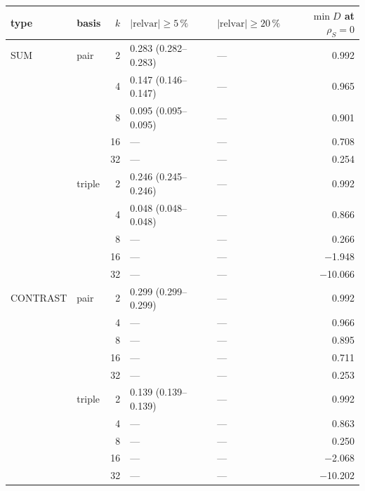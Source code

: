\footnotesize
\begin{tabular}{llrllr}
\toprule
type & basis & $k$ & $|\mathrm{relvar}|\geq 5\,\%$ & $|\mathrm{relvar}|\geq 20\,\%$ & $\min D$ at $\rho_S=0$ \\
\midrule
SUM & pair & 2 & 0.283 (0.282--0.283) & --- & 0.992 \\
 &  & 4 & 0.147 (0.146--0.147) & --- & 0.965 \\
 &  & 8 & 0.095 (0.095--0.095) & --- & 0.901 \\
 &  & 16 & --- & --- & 0.708 \\
 &  & 32 & --- & --- & 0.254 \\
 & triple & 2 & 0.246 (0.245--0.246) & --- & 0.992 \\
 &  & 4 & 0.048 (0.048--0.048) & --- & 0.866 \\
 &  & 8 & --- & --- & 0.266 \\
 &  & 16 & --- & --- & $-$1.948 \\
 &  & 32 & --- & --- & $-$10.066 \\
CONTRAST & pair & 2 & 0.299 (0.299--0.299) & --- & 0.992 \\
 &  & 4 & --- & --- & 0.966 \\
 &  & 8 & --- & --- & 0.895 \\
 &  & 16 & --- & --- & 0.711 \\
 &  & 32 & --- & --- & 0.253 \\
 & triple & 2 & 0.139 (0.139--0.139) & --- & 0.992 \\
 &  & 4 & --- & --- & 0.863 \\
 &  & 8 & --- & --- & 0.250 \\
 &  & 16 & --- & --- & $-$2.068 \\
 &  & 32 & --- & --- & $-$10.202 \\
\bottomrule
\end{tabular}
